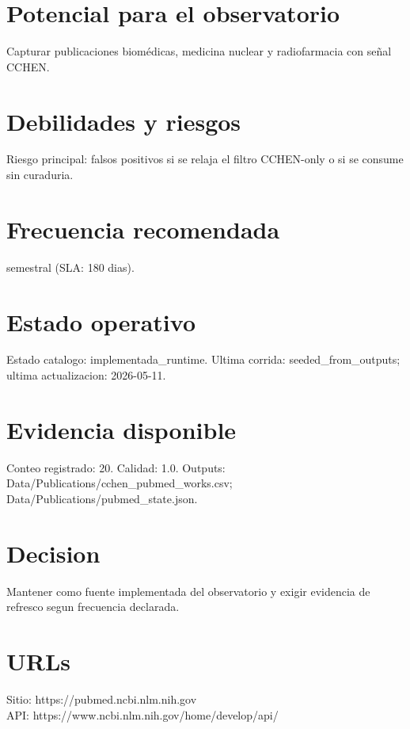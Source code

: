 \documentclass[10pt,a4paper]{article}
\begin{document}
\section*{Potencial para el observatorio}
Capturar publicaciones biomédicas, medicina nuclear y radiofarmacia con señal CCHEN.

\section*{Debilidades y riesgos}
Riesgo principal: falsos positivos si se relaja el filtro CCHEN-only o si se consume sin curaduria.

\section*{Frecuencia recomendada}
semestral (SLA: 180 dias).

\section*{Estado operativo}
Estado catalogo: implementada\_runtime. Ultima corrida: seeded\_from\_outputs; ultima actualizacion: 2026-05-11.

\section*{Evidencia disponible}
Conteo registrado: 20. Calidad: 1.0. Outputs: Data/Publications/cchen\_pubmed\_works.csv; Data/Publications/pubmed\_state.json.

\section*{Decision}
Mantener como fuente implementada del observatorio y exigir evidencia de refresco segun frecuencia declarada.


\section*{URLs}
Sitio: https://pubmed.ncbi.nlm.nih.gov\\
API: https://www.ncbi.nlm.nih.gov/home/develop/api/
\end{document}
